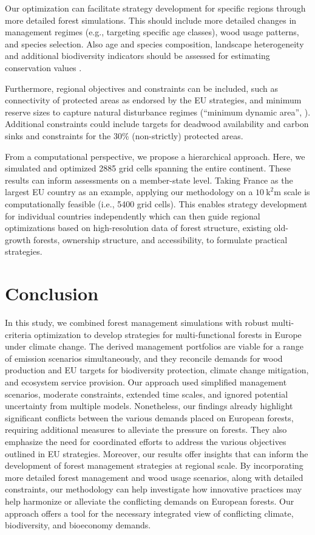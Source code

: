 \documentclass[]{article}
\begin{document}
Our optimization can facilitate strategy development for specific regions through more detailed forest simulations. This should include more detailed changes in management regimes (e.g., targeting specific age classes), wood usage patterns, and species selection.
Also age and species composition, landscape heterogeneity and additional biodiversity indicators \parencite[e.g.,][]{Muller2010, Cordonnier2014} should be assessed for estimating conservation values \parencite{Neugarten2024}.

Furthermore, regional objectives and constraints can be included, such as connectivity of protected areas as endorsed by the EU strategies, and minimum reserve sizes to capture natural disturbance regimes (``minimum dynamic area'', \textcite{pickettPatchDynamicsDesign1978}). Additional constraints could include targets for deadwood availability and carbon sinks and constraints for the 30\% (non-strictly) protected areas.

From a computational perspective, we propose a hierarchical approach. Here, we simulated and optimized 2885 grid cells spanning the entire continent. These results can inform assessments on a member-state level. Taking France as the largest EU country as an example, applying our methodology on a $\SI{10}{\square\kilo\meter}$ scale is computationally feasible (i.e., 5400 grid cells). This enables strategy development for individual countries independently which can then guide regional optimizations based on high-resolution data of forest structure, existing old-growth forests, ownership structure, and accessibility, to formulate practical strategies.



\section{Conclusion}
In this study, we combined forest management simulations with robust multi-criteria optimization to develop strategies for multi-functional forests in Europe under climate change. The derived management portfolios are viable for a range of emission scenarios simultaneously, and they reconcile demands for wood production and EU targets for biodiversity protection, climate change mitigation, and ecosystem service provision.
Our approach used simplified management scenarios, moderate constraints, extended time scales, and ignored potential uncertainty from multiple models. 
Nonetheless, our findings already highlight significant conflicts between the various demands placed on European forests, requiring additional measures to alleviate the pressure on forests. They also emphasize the need for coordinated efforts to address the various objectives outlined in EU strategies.
Moreover, our results offer insights that can inform the development of forest management strategies at regional scale.
By incorporating more detailed forest management and wood usage scenarios, along with detailed constraints, our methodology can help investigate how innovative practices may help harmonize or alleviate the conflicting demands on European forests. Our approach offers a tool for the necessary integrated view of conflicting climate, biodiversity, and bioeconomy demands.
\end{document}
